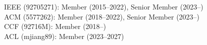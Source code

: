 \documentclass[10pt]{article}
\newenvironment{myindentpar}[1]%
{\begin{list}{}%
         {\setlength{\leftmargin}{#1}}%
         \item[]%
}
{\end{list}}
\newcounter{list}
\begin{document}
\begin{myindentpar}{0.75cm}
{}

\hspace{-0.75cm}{\bf Professional Membership}

{\small

IEEE (92705271): Member (2015--2022), Senior Member (2023--) \\
ACM (5577262): Member (2018--2022), Senior Member (2023--) \\
CCF (92716M): Member (2018--) \\
ACL (mjiang89): Member (2023--2027)
}

\end{myindentpar}
\end{document}
